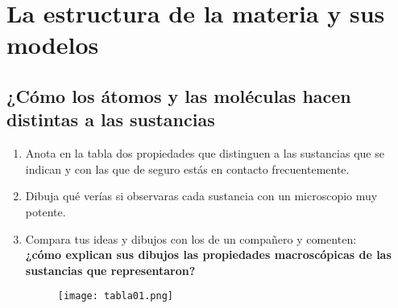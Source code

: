 \thispagestyle{plain}
\section{La estructura de la materia y sus modelos}

\subsection{¿Cómo los átomos y las moléculas hacen distintas a las sustancias}

\begin{boxK}
    \begin{enumerate}
        \item Anota en la tabla dos propiedades que distinguen a las sustancias que se indican y con
              las que de seguro estás en contacto frecuentemente.
        \item Dibuja qué verías si observaras cada sustancia con un microscopio muy potente.
        \item Compara tus ideas y dibujos con los de un compañero y comenten: \\
              \textbf{¿cómo explican sus dibujos las propiedades macroscópicas de las sustancias que representaron?}
              \begin{figure}[H]
                  \centering
                  \texttt{[image: tabla01.png]}
                  \label{tab:tabla01}
              \end{figure}%
    \end{enumerate}
\end{boxK}

